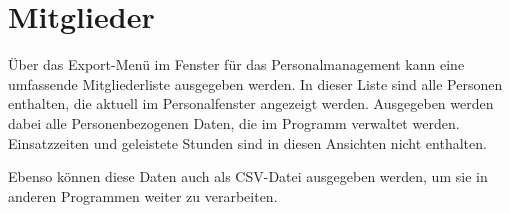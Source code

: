 \section{Mitglieder}
Über das Export-Menü im Fenster für das Personalmanagement kann eine umfassende Mitgliederliste ausgegeben werden.
In dieser Liste sind alle Personen enthalten, die aktuell im Personalfenster angezeigt werden.
Ausgegeben werden dabei alle Personenbezogenen Daten, die im Programm verwaltet werden.
Einsatzzeiten und geleistete Stunden sind in diesen Ansichten nicht enthalten.

Ebenso können diese Daten auch als CSV-Datei ausgegeben werden, um sie in anderen Programmen weiter zu verarbeiten.
